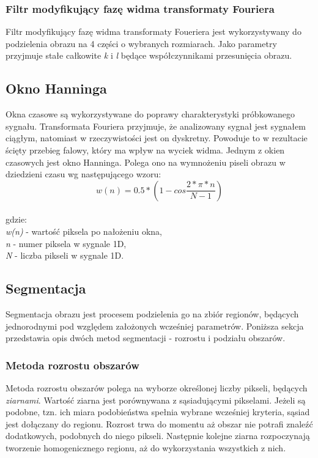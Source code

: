 \documentclass{classrep}
\begin{document}
\subsubsection{Filtr modyfikujący fazę widma transformaty Fouriera}
Filtr modyfikujący fazę widma transformaty Foueriera jest wykorzystywany do podzielenia obrazu na 4 części o wybranych rozmiarach. Jako parametry przyjmuje stałe całkowite \textit{k} i \textit{l} będące współczynnikami przesunięcia obrazu.

\subsection{Okno Hanninga}
Okna czasowe są wykorzystywane do poprawy charakterystyki próbkowanego sygnału. Transformata Fouriera przyjmuje, że analizowany sygnał jest sygnałem ciągłym, natomiast w rzeczywistości jest on dyskretny. Powoduje to w rezultacie ścięty przebieg falowy, który ma wpływ na wyciek widma. Jednym z okien czasowych jest okno Hanninga. Polega ono na wymnożeniu piseli obrazu w dziedzieni czasu wg następującego wzoru:\\
\[ w(n) = 0.5 * (1 - cos \frac{2 \ast \pi \ast n}{N - 1}) \]
\\
gdzie:\\
\textit{w(n)} - wartość piksela po nałożeniu okna,\\
\textit{n} - numer piksela w sygnale 1D,\\
\textit{N} - liczba pikseli w sygnale 1D.\\

\subsection{Segmentacja}
Segmentacja obrazu jest procesem podzielenia go na zbiór regionów, będących jednorodnymi pod względem założonych wcześniej parametrów. Poniższa sekcja przedstawia opis dwóch metod segmentacji - rozrostu i podziału obszarów.

\subsubsection{Metoda rozrostu obszarów}
Metoda rozrostu obszarów polega na wyborze określonej liczby pikseli, będących \textit{ziarnami}. Wartość ziarna jest porównywana z sąsiadującymi pikselami. Jeżeli są podobne, tzn. ich miara podobieństwa spełnia wybrane wcześniej kryteria, sąsiad jest dołączany do regionu. Rozrost trwa do momentu aż obszar nie potrafi znaleźć dodatkowych, podobnych do niego pikseli. Następnie kolejne ziarna rozpoczynają tworzenie homogenicznego regionu, aż do wykorzystania wszystkich z nich. 
\end{document}
